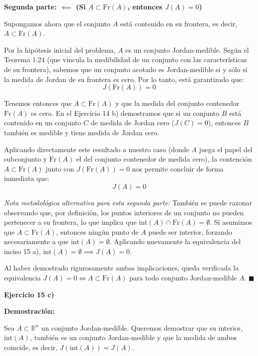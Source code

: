 \documentclass[11pt,letterpaper]{article}
\begin{document}
\vspace{0.5cm}
\textbf{Segunda parte: $\impliedby$ (Si $A \subset \text{Fr}(A)$, entonces $J(A) = 0$)}

Supongamos ahora que el conjunto $A$ está contenido en su frontera, es decir, $A \subset \text{Fr}(A)$.

Por la hipótesis inicial del problema, $A$ es un conjunto Jordan-medible. Según el Teorema 1.24 (que vincula la medibilidad de un conjunto con las características de su frontera), sabemos que un conjunto acotado es Jordan-medible si y sólo si la medida de Jordan de su frontera es cero. Por lo tanto, está garantizado que:
\begin{equation*}
J(\text{Fr}(A)) = 0
\end{equation*}

Tenemos entonces que $A \subset \text{Fr}(A)$ y que la medida del conjunto contenedor $\text{Fr}(A)$ es cero. En el Ejercicio 14 b) demostramos que si un conjunto $B$ está contenido en un conjunto $C$ de medida de Jordan cero ($J(C) = 0$), entonces $B$ también es medible y tiene medida de Jordan cero. 

Aplicando directamente este resultado a nuestro caso (donde $A$ juega el papel del subconjunto y $\text{Fr}(A)$ el del conjunto contenedor de medida cero), la contención $A \subset \text{Fr}(A)$ junto con $J(\text{Fr}(A)) = 0$ nos permite concluir de forma inmediata que:
\begin{equation*}
J(A) = 0
\end{equation*}

\textit{Nota metodológica alternativa para esta segunda parte:} También se puede razonar observando que, por definición, los puntos interiores de un conjunto no pueden pertenecer a su frontera, lo que implica que $\text{int}(A) \cap \text{Fr}(A) = \emptyset$. Si asumimos que $A \subset \text{Fr}(A)$, entonces ningún punto de $A$ puede ser interior, forzando necesariamente a que $\text{int}(A) = \emptyset$. Aplicando nuevamente la equivalencia del inciso 15 a), $\text{int}(A) = \emptyset \implies J(A) = 0$.

\vspace{0.5cm}
Al haber demostrado rigurosamente ambas implicaciones, queda verificada la equivalencia $J(A) = 0 \iff A \subset \text{Fr}(A)$ para todo conjunto Jordan-medible $A$. \hfill $\blacksquare$

\textbf{Ejercicio 15 c)}

\textbf{Demostración:}

Sea $A \subset \mathbb{R}^n$ un conjunto Jordan-medible. Queremos demostrar que su interior, $\text{int}(A)$, también es un conjunto Jordan-medible y que la medida de ambos coincide, es decir, $J(\text{int}(A)) = J(A)$.
\end{document}
